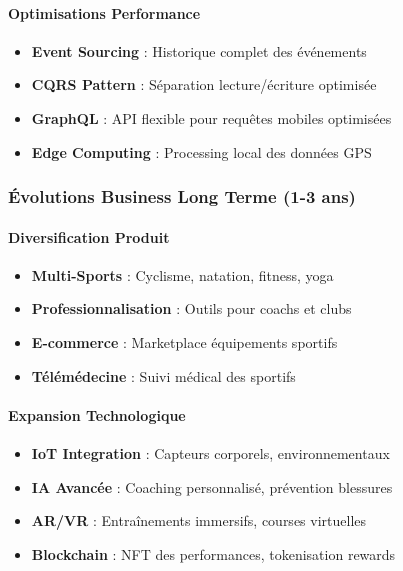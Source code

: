 \paragraph{Optimisations Performance}
\begin{itemize}
    \item \textbf{Event Sourcing} : Historique complet des événements
    \item \textbf{CQRS Pattern} : Séparation lecture/écriture optimisée
    \item \textbf{GraphQL} : API flexible pour requêtes mobiles optimisées
    \item \textbf{Edge Computing} : Processing local des données GPS
\end{itemize}

\subsubsection{Évolutions Business Long Terme (1-3 ans)}

\paragraph{Diversification Produit}
\begin{itemize}
    \item \textbf{Multi-Sports} : Cyclisme, natation, fitness, yoga
    \item \textbf{Professionnalisation} : Outils pour coachs et clubs
    \item \textbf{E-commerce} : Marketplace équipements sportifs
    \item \textbf{Télémédecine} : Suivi médical des sportifs
\end{itemize}

\paragraph{Expansion Technologique}
\begin{itemize}
    \item \textbf{IoT Integration} : Capteurs corporels, environnementaux
    \item \textbf{IA Avancée} : Coaching personnalisé, prévention blessures
    \item \textbf{AR/VR} : Entraînements immersifs, courses virtuelles
    \item \textbf{Blockchain} : NFT des performances, tokenisation rewards
\end{itemize}


